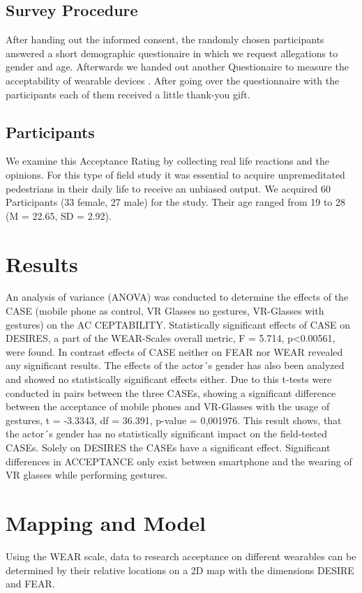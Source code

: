 \documentclass[sigchi]{acmart}
\begin{document}
\subsection{Survey Procedure}

After handing out the informed consent, the randomly chosen participants answered a short demographic questionaire in which we request allegations to gender and age. Afterwards we handed out another Questionaire to measure the acceptability of wearable devices \cite{kelly2016wear}. After going over the questionnaire with the participants each of them received a little thank-you gift.

\subsection{Participants}

We examine this Acceptance Rating by collecting real life reactions and the opinions. For this type of field study it was essential to acquire unpremeditated pedestrians in their daily life to receive an unbiased output. We acquired 60 Participants (33 female, 27 male) for the study. Their age ranged from 19 to 28 (M = 22.65, SD = 2.92).

\section {Results}
An analysis of variance (ANOVA) was conducted to determine the effects of the CASE (mobile phone as control, VR Glasses no gestures, VR-Glasses with gestures) on the AC CEPTABILITY. Statistically significant effects of CASE on DESIRES, a part of the WEAR-Scales overall metric, F = 5.714, p<0.00561, were found. In contrast effects of CASE neither on FEAR nor WEAR revealed any significant results. The effects of the actor´s gender has also been analyzed and showed no statistically significant effects either. Due to this t-tests were conducted in pairs between the three CASEs, showing a significant difference between the acceptance of mobile phones and VR-Glasses with the usage of gestures, t = -3.3343, df = 36.391, p-value = 0,001976. This result shows, that the actor´s gender has no statistically significant impact on the field-tested CASEs. Solely on DESIRES the CASEs have a significant effect. Significant differences in ACCEPTANCE only exist between smartphone and the wearing of VR glasses while performing gestures.

\section {Mapping and Model}
Using the WEAR scale, data to research acceptance on different wearables can be determined by their relative locations on a 2D map with the dimensions DESIRE and FEAR.
\end{document}
